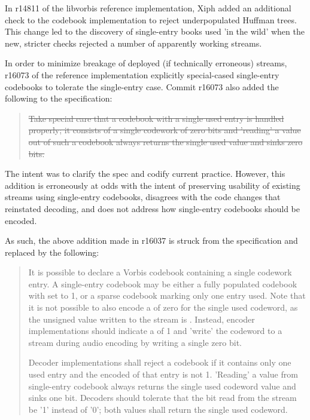 In r14811 of the libvorbis reference implementation, Xiph added an
additional check to the codebook implementation to reject
underpopulated Huffman trees. This change led to the discovery of
single-entry books used 'in the wild' when the new, stricter checks
rejected a number of apparently working streams.

In order to minimize breakage of deployed (if technically erroneous)
streams, r16073 of the reference implementation explicitly
special-cased single-entry codebooks to tolerate the single-entry
case.  Commit r16073 also added the following to the specification:

\blockquote{\sout{Take special care that a codebook with a single used
    entry is handled properly; it consists of a single codework of
    zero bits and ’reading’ a value out of such a codebook always
    returns the single used value and sinks zero bits.
}} 

The intent was to clarify the spec and codify current practice.
However, this addition is erroneously at odds with the intent of preserving
usability of existing streams using single-entry codebooks, disagrees
with the code changes that reinstated decoding, and does not address how
single-entry codebooks should be encoded.

As such, the above addition made in r16037 is struck from the
specification and replaced by the following:

\blockquote{It is possible to declare a Vorbis codebook containing a
  single codework entry.  A single-entry codebook may be either a
  fully populated codebook with  set to
  1, or a sparse codebook marking only one entry used.  Note that it
  is not possible to also encode a  of
  zero for the single used codeword, as the unsigned value written to
  the stream is .  Instead, encoder
  implementations should indicate a  of 1
  and 'write' the codeword to a stream during audio encoding by
  writing a single zero bit.

  Decoder implementations shall reject a codebook if it contains only
  one used entry and the encoded  of that
  entry is not 1.  'Reading' a value from single-entry codebook always
  returns the single used codeword value and sinks one bit.  Decoders
  should tolerate that the bit read from the stream be '1' instead of
  '0'; both values shall return the single used codeword.}

